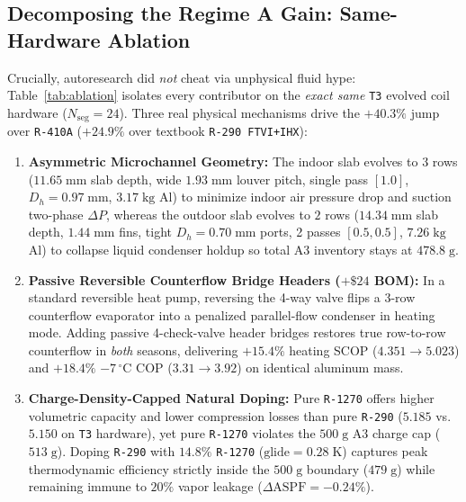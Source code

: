 \documentclass[twocolumn,10pt]{article}
\begin{document}
\subsection{Decomposing the Regime A Gain: Same-Hardware Ablation}
Crucially, autoresearch did \emph{not} cheat via unphysical fluid hype: Table~\ref{tab:ablation} isolates every contributor on the \emph{exact same} \texttt{T3} evolved coil hardware ($N_{\text{seg}}=24$). Three real physical mechanisms drive the $+40.3\%$ jump over \texttt{R-410A} ($+24.9\%$ over textbook \texttt{R-290 FTVI+IHX}):
\begin{enumerate}\setlength{\itemsep}{1pt}
  \item \textbf{Asymmetric Microchannel Geometry:} The indoor slab evolves to $3$ rows ($11.65\;\text{mm}$ slab depth, wide $1.93\;\text{mm}$ louver pitch, single pass $[1.0]$, $D_h=0.97\;\text{mm}$, $3.17\;\text{kg}$ Al) to minimize indoor air pressure drop and suction two-phase $\Delta P$, whereas the outdoor slab evolves to $2$ rows ($14.34\;\text{mm}$ slab depth, $1.44\;\text{mm}$ fins, tight $D_h=0.70\;\text{mm}$ ports, 2 passes $[0.5, 0.5]$, $7.26\;\text{kg}$ Al) to collapse liquid condenser holdup so total A3 inventory stays at $478.8\;\text{g}$.
  \item \textbf{Passive Reversible Counterflow Bridge Headers ($+\$24$ BOM):} In a standard reversible heat pump, reversing the 4-way valve flips a 3-row counterflow evaporator into a penalized parallel-flow condenser in heating mode. Adding passive 4-check-valve header bridges restores true row-to-row counterflow in \emph{both} seasons, delivering $+15.4\%$ heating SCOP ($4.351\to 5.023$) and $+18.4\%$ $-7\,^\circ\text{C}$ COP ($3.31\to 3.92$) on identical aluminum mass.
  \item \textbf{Charge-Density-Capped Natural Doping:} Pure \texttt{R-1270} offers higher volumetric capacity and lower compression losses than pure \texttt{R-290} ($5.185$ vs.\ $5.150$ on \texttt{T3} hardware), yet pure \texttt{R-1270} violates the $500\;\text{g}$ A3 charge cap ($513\;\text{g}$). Doping \texttt{R-290} with $14.8\%$ \texttt{R-1270} ($\text{glide}=0.28\;\text{K}$) captures peak thermodynamic efficiency strictly inside the $500\;\text{g}$ boundary ($479\;\text{g}$) while remaining immune to $20\%$ vapor leakage ($\Delta\text{ASPF}=-0.24\%$).
\end{enumerate}
\end{document}

